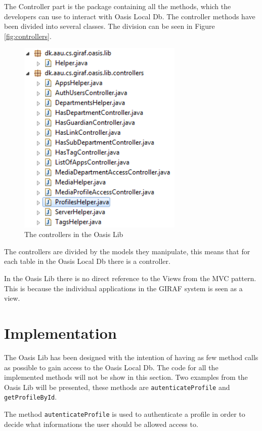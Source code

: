 The Controller part is the package containing all the methods, which the developers can use to interact with Oasis Local Db.
The controller methods have been divided into several classes.
The division can be seen in Figure \vref{fig:controllers}.
\begin{figure}[H]
	\centering
		\includegraphics[width=0.7\textwidth]{images/controllers.png}
	\caption{The controllers in the Oasis Lib}
	\label{fig:controllers}
\end{figure}

The controllers are divided by the models they manipulate, this means that for each table in the Oasis Local Db there is a controller.

In the Oasis Lib there is no direct reference to the Views from the MVC pattern.
This is because the individual applications in the GIRAF system is seen as a view.

\section{Implementation}
\label{sec:LibImp}
The Oasis Lib has been designed with the intention of having as few method calls as possible to gain access to the Oasis Local Db.
The code for all the implemented methods will not be show in this section.
Two examples from the Oasis Lib will be presented, these methods are \texttt{autenticateProfile} and \texttt{getProfileById}.


The method \texttt{autenticateProfile} is used to authenticate a profile in order to decide what informations the user should be allowed access to.

